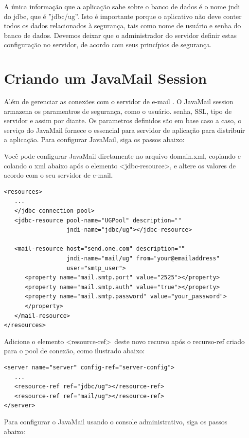 \documentclass[envcountsame,envcountchap,letterpaper]{svmono}
\begin{document}
A única informação que a aplicação sabe sobre o banco de dados é o nome jndi do jdbc, que é ''jdbc/ug''. Isto é importante porque o aplicativo não deve conter todos os dados relacionados à segurança, tais como nome de usuário e senha do banco de dados. Devemos deixar que o administrador do servidor definir estas configuração no servidor, de acordo com seus princípios de segurança.

\section{Criando um JavaMail Session}

Além de gerenciar as conexões com o servidor de e-mail . O JavaMail session armazena os paramentros de segurança, como o usuário. senha, SSL, tipo de servidor e assim por diante. Os parametros definidos são em base caso a caso,  o serviço do JavaMail fornece o essencial para servidor de aplicação para distribuir a aplicação. Para configurar JavaMail, siga os passos abaixo:

Você pode configurar JavaMail diretamente no arquivo domain.xml, copiando e colando o xml abaixo após o elemento \textless jdbc-resource\textgreater, e altere os valores de acordo com o seu servidor de e-mail.

\begin{verbatim}
<resources>
   ...
   </jdbc-connection-pool>
   <jdbc-resource pool-name="UGPool" description=""
                  jndi-name="jdbc/ug"></jdbc-resource>

   <mail-resource host="send.one.com" description=""
                  jndi-name="mail/ug" from="your@emailaddress"
                  user="smtp_user">
      <property name="mail.smtp.port" value="2525"></property>
      <property name="mail.smtp.auth" value="true"></property>
      <property name="mail.smtp.password" value="your_password">
      </property>
   </mail-resource>
</resources>
\end{verbatim}

Adicione o elemento \textless resource-ref\textgreater \ deste novo recurso após o recurso-ref criado para o pool de conexão, como ilustrado abaixo:

\begin{verbatim}
<server name="server" config-ref="server-config">
   ...
   <resource-ref ref="jdbc/ug"></resource-ref>
   <resource-ref ref="mail/ug"></resource-ref>
</server>
\end{verbatim}

Para configurar o JavaMail usando o console administrativo, siga os passos abaixo:
\end{document}
